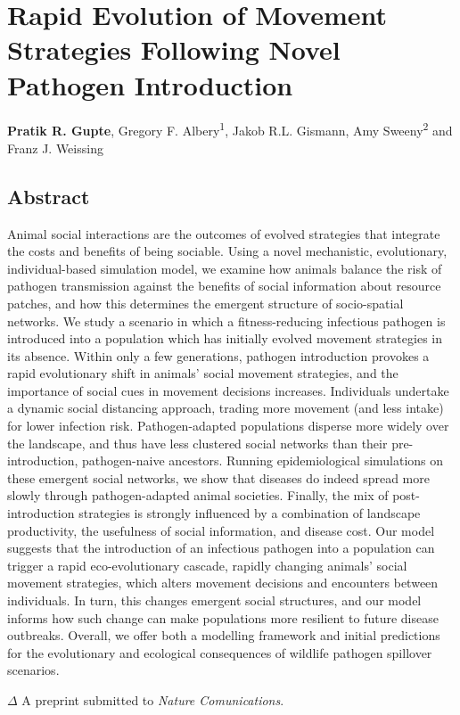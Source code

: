 \chapter{Rapid Evolution of Movement Strategies Following Novel Pathogen Introduction}\label{ch:pathomove}

{\noindent \textbf{Pratik R. Gupte}, Gregory F. Albery\textsuperscript{1}, Jakob R.L. Gismann, Amy Sweeny\textsuperscript{2} and Franz J. Weissing}


\section*{Abstract}

{
    Animal social interactions are the outcomes of evolved strategies that integrate the costs and benefits of being sociable.
    Using a novel mechanistic, evolutionary, individual-based simulation model, we examine how animals balance the risk of pathogen transmission against the benefits of social information about resource patches, and how this determines the emergent structure of socio-spatial networks.
    We study a scenario in which a fitness-reducing infectious pathogen is introduced into a population which has initially evolved movement strategies in its absence.
    Within only a few generations, pathogen introduction provokes a rapid evolutionary shift in animals' social movement strategies, and the importance of social cues in movement decisions increases.
    Individuals undertake a dynamic social distancing approach, trading more movement (and less intake) for lower infection risk.
    Pathogen-adapted populations disperse more widely over the landscape, and thus have less clustered social networks than their pre-introduction, pathogen-naive ancestors.
    Running epidemiological simulations on these emergent social networks, we show that diseases do indeed spread more slowly through pathogen-adapted animal societies.
    Finally, the mix of post-introduction strategies is strongly influenced by a combination of landscape productivity, the usefulness of social information, and disease cost.
    Our model suggests that the introduction of an infectious pathogen into a population can trigger a rapid eco-evolutionary cascade, rapidly changing animals' social movement strategies, which alters movement decisions and encounters between individuals. 
    In turn, this changes emergent social structures, and our model informs how such change can make populations more resilient to future disease outbreaks.
    Overall, we offer both a modelling framework and initial predictions for the evolutionary and ecological consequences of wildlife pathogen spillover scenarios.

    \bigskip

    {\noindent \large{$\Delta$}} A preprint submitted to \textit{Nature Comunications}.
}

\clearpage